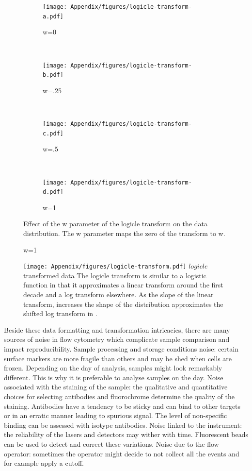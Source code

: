 \begin{figure}[h]
\centering
\begin{subfigure}[b]{.4\textwidth}
    \centering
    \texttt{[image: Appendix/figures/logicle-transform-a.pdf]}
    \caption{w=0}
\end{subfigure}
~
\begin{subfigure}[b]{.4\textwidth}
    \centering
    \texttt{[image: Appendix/figures/logicle-transform-b.pdf]}
    \caption{w=.25}
\end{subfigure}
~
\begin{subfigure}[b]{.4\textwidth}
    \centering
    \texttt{[image: Appendix/figures/logicle-transform-c.pdf]}
    \caption{w=.5}
\end{subfigure}
~
\begin{subfigure}[b]{.4\textwidth}
    \centering
    \texttt{[image: Appendix/figures/logicle-transform-d.pdf]}
    \caption{w=1}
\end{subfigure}
{Effect of the w parameter of the logicle transform on the data distribution.}
{
  The w parameter maps the zero of the transform to w.
}
\end{figure}

\begin{figure}[h]
\centering
\texttt{[image: Appendix/figures/logicle-transform.pdf]}
{$logicle$ transformed data}
{
  The logicle transform is similar to a logistic function in that it approximates a linear transform around the first decade
  and a log transform elsewhere.
  As the slope of the linear transform, increases the shape of the distribution approximates the shifted log transform in .
}
\end{figure}


Beside these data formatting and transformation intricacies, there are many sources of noise in flow cytometry which complicate sample comparison and impact reproducibility.  
Sample processing and storage conditions noise:
certain surface markers are more fragile than others and may be shed when cells are frozen.
Depending on the day of analysis, samples might look remarkably different.
This is why it is preferable to analyse samples on the day.  
Noise associated with the staining of the sample:
the qualitative and quantitative choices for selecting antibodies and fluorochrome determine the quality of the staining.
Antibodies have a tendency to be sticky and can bind to other targets or in an erratic manner leading to spurious signal.
The level of non-specific binding can be assessed with isotype antibodies.  
Noise linked to the instrument:
the reliability of the lasers and detectors may wither with time.
Fluorescent beads can be used to detect and correct these variations.  
Noise due to the flow operator:
sometimes the operator might decide to not collect all the events and for example apply a cutoff.

